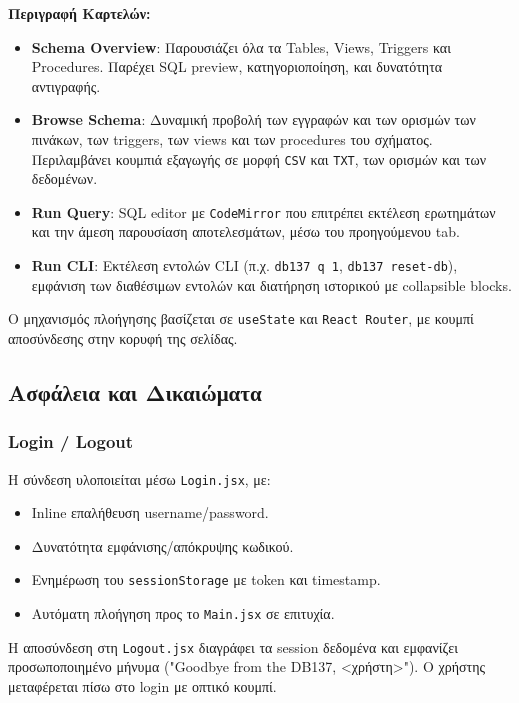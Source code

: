 \documentclass[13pt]{extarticle}
\begin{document}
\vspace{0.5em}
\textbf{Περιγραφή Καρτελών:}
\begin{itemize}
    \item \textbf{Schema Overview}: Παρουσιάζει όλα τα Tables, Views, Triggers και Procedures. Παρέχει SQL preview, κατηγοριοποίηση, και δυνατότητα αντιγραφής.
    
    \item \textbf{Browse Schema}: Δυναμική προβολή των εγγραφών και των ορισμών των πινάκων, των triggers, των views και των procedures του σχήματος. Περιλαμβάνει κουμπιά εξαγωγής σε μορφή \texttt{CSV} και \texttt{TXT}, των ορισμών και των δεδομένων.
    
    \item \textbf{Run Query}: SQL editor με \texttt{CodeMirror} που επιτρέπει εκτέλεση ερωτημάτων και την άμεση παρουσίαση αποτελεσμάτων, μέσω του προηγούμενου tab.
    
    \item \textbf{Run CLI}: Εκτέλεση εντολών CLI (π.χ. \texttt{db137 q 1}, \texttt{db137 reset-db}), εμφάνιση των διαθέσιμων εντολών και διατήρηση ιστορικού με collapsible blocks.
\end{itemize}

Ο μηχανισμός πλοήγησης βασίζεται σε \texttt{useState} και \texttt{React Router}, με κουμπί αποσύνδεσης στην κορυφή της σελίδας.

\subsection{Ασφάλεια και Δικαιώματα}

\subsubsection{Login / Logout}
Η σύνδεση υλοποιείται μέσω \texttt{Login.jsx}, με:
\begin{itemize}
    \item Inline επαλήθευση username/password.
    \item Δυνατότητα εμφάνισης/απόκρυψης κωδικού.
    \item Ενημέρωση του \texttt{sessionStorage} με token και timestamp.
    \item Αυτόματη πλοήγηση προς το \texttt{Main.jsx} σε επιτυχία.
\end{itemize}

Η αποσύνδεση στη \texttt{Logout.jsx} διαγράφει τα session δεδομένα και εμφανίζει προσωποποιημένο μήνυμα ("Goodbye from the DB137, <χρήστη>"). Ο χρήστης μεταφέρεται πίσω στο login με οπτικό κουμπί.
\end{document}
